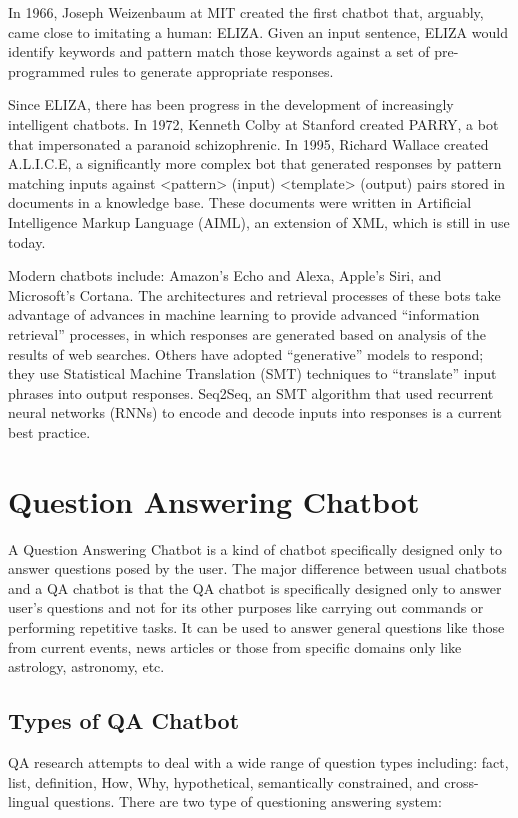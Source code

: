In 1966, Joseph Weizenbaum at MIT created the first chatbot that, arguably, came
close to imitating a human: ELIZA. Given an input sentence, ELIZA would identify
keywords and pattern match those keywords against a set of pre-programmed rules
to generate appropriate responses. 

Since ELIZA, there has been progress in the development of increasingly
intelligent chatbots. In 1972, Kenneth Colby at Stanford created PARRY, a bot
that impersonated a paranoid schizophrenic. In 1995, Richard Wallace created
A.L.I.C.E, a significantly more complex bot that generated responses by pattern
matching inputs against <pattern> (input) <template> (output) pairs stored in
documents in a knowledge base. These documents were written in Artificial
Intelligence Markup Language (AIML), an extension of XML, which is still in use
today. 

Modern chatbots include: Amazon’s Echo and Alexa, Apple’s Siri, and Microsoft’s
Cortana. The architectures and retrieval processes of these bots take advantage
of advances in machine learning to provide advanced “information retrieval”
processes, in which responses are generated based on analysis of the results of
web searches. Others have adopted “generative” models to respond; they use
Statistical Machine Translation (SMT) techniques to “translate” input phrases
into output responses. Seq2Seq, an SMT algorithm that used recurrent neural
networks (RNNs) to encode and decode inputs into responses is a current best
practice.

\section{Question Answering Chatbot}
A Question Answering Chatbot is a kind of chatbot specifically designed only to
answer questions posed by the user. The major difference between usual chatbots
and a QA chatbot is that the QA chatbot is specifically designed only to answer
user’s questions and not for its other purposes like carrying out commands or
performing repetitive tasks. It can be used to answer general questions like
those from current events, news articles or those from specific domains only
like astrology, astronomy, etc. 


\subsection{Types of QA Chatbot}
QA research attempts to deal with a wide range of question types including:
fact, list, definition, How, Why, hypothetical, semantically constrained, and
cross-lingual questions. There are two type of questioning answering system:

